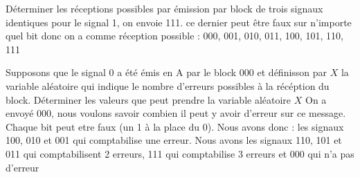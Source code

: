 \begin{exo}
  \begin{subexo}{Déterminer les réceptions possibles par émission par block de trois signaux identiques}
    pour le signal 1, on envoie 111. ce dernier peut être faux sur n'importe quel bit donc on a
    comme réception possible : 000, 001, 010, 011, 100, 101, 110, 111
  \end{subexo}
  \begin{subexo}{Supposons que le signal 0 a été émis en A par le block 000 et définisson par $X$ la variable aléatoire qui indique le nombre d'erreurs possibles à la récéption du block. Déterminer les valeurs que peut prendre la variable aléatoire $X$}
    On a envoyé 000, nous voulons savoir combien il peut y avoir d'erreur sur ce message.
    Chaque bit peut etre faux (un 1 à la place du 0).
    Nous avons donc : les signaux 100, 010 et 001 qui comptabilise une erreur. Nous avons les signaux 110, 101 et 011 qui comptabilisent 2 erreurs, 111 qui comptabilise 3 erreurs et 000 qui n'a pas d'erreur


\end{subexo}
\end{exo}
